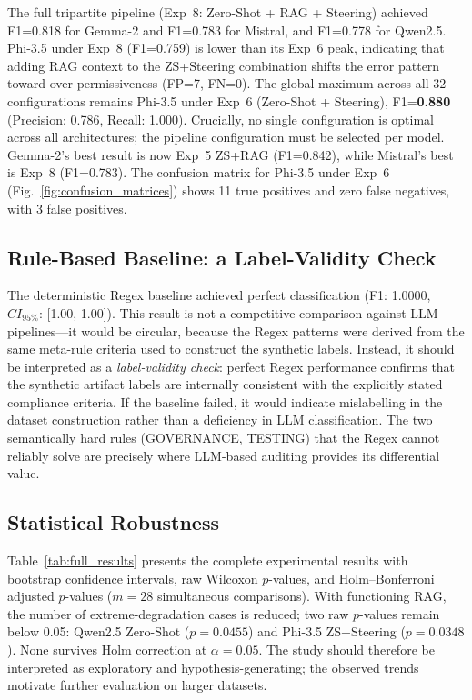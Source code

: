 \documentclass{ieeeaccess}
\begin{document}
The full tripartite pipeline (Exp~8: Zero-Shot + RAG + Steering) achieved F1=0.818 for Gemma-2 and F1=0.783 for Mistral, and F1=0.778 for Qwen2.5. Phi-3.5 under Exp~8 (F1=0.759) is lower than its Exp~6 peak, indicating that adding RAG context to the ZS+Steering combination shifts the error pattern toward over-permissiveness (FP=7, FN=0). The global maximum across all 32 configurations remains Phi-3.5 under Exp~6 (Zero-Shot + Steering), F1=\textbf{0.880} (Precision: 0.786, Recall: 1.000). Crucially, no single configuration is optimal across all architectures; the pipeline configuration must be selected per model. Gemma-2's best result is now Exp~5 ZS+RAG (F1=0.842), while Mistral's best is Exp~8 (F1=0.783). The confusion matrix for Phi-3.5 under Exp~6 (Fig.~\ref{fig:confusion_matrices}) shows 11 true positives and zero false negatives, with 3 false positives.

\subsection{Rule-Based Baseline: a Label-Validity Check}

The deterministic Regex baseline achieved perfect classification (F1: 1.0000, $CI_{95\%}$: [1.00, 1.00]). This result is not a competitive comparison against LLM pipelines---it would be circular, because the Regex patterns were derived from the same meta-rule criteria used to construct the synthetic labels. Instead, it should be interpreted as a \emph{label-validity check}: perfect Regex performance confirms that the synthetic artifact labels are internally consistent with the explicitly stated compliance criteria. If the baseline failed, it would indicate mislabelling in the dataset construction rather than a deficiency in LLM classification. The two semantically hard rules (GOVERNANCE, TESTING) that the Regex cannot reliably solve are precisely where LLM-based auditing provides its differential value.

\subsection{Statistical Robustness}

Table~\ref{tab:full_results} presents the complete experimental results with bootstrap confidence intervals, raw Wilcoxon $p$-values, and Holm--Bonferroni adjusted $p$-values ($m=28$ simultaneous comparisons). With functioning RAG, the number of extreme-degradation cases is reduced; two raw $p$-values remain below 0.05: Qwen2.5 Zero-Shot ($p=0.0455$) and Phi-3.5 ZS+Steering ($p=0.0348$). None survives Holm correction at $\alpha=0.05$. The study should therefore be interpreted as exploratory and hypothesis-generating; the observed trends motivate further evaluation on larger datasets.
\end{document}
